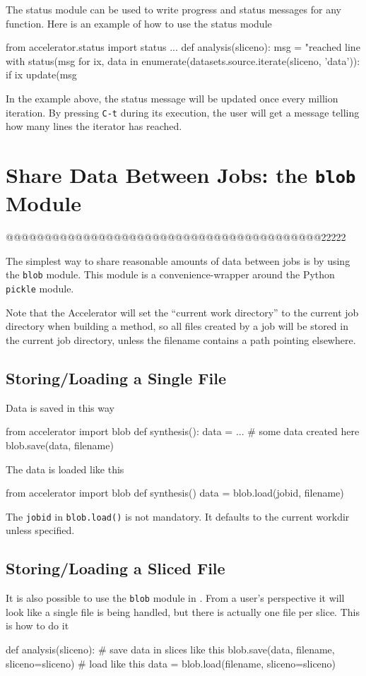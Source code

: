 The status module can be used to write progress and status messages
for any function.  Here is an example of how to use the status module
\begin{python}
from accelerator.status import status
...
def analysis(sliceno):
    msg = "reached line %
    with status(msg %
        for ix, data in enumerate(datasets.source.iterate(sliceno, 'data')):
            if ix %
                update(msg %
\end{python}
In the example above, the status message will be updated once every
million iteration.  By pressing \texttt{C-t} during its execution, the
user will get a message telling how many lines the iterator has
reached.





\section{Share Data Between Jobs:  the \texttt{blob} Module}
@@@@@@@@@@@@@@@@@@@@@@@@@@@@@@@@@@@@@@@@@22222

The simplest way to share reasonable amounts of data between jobs is
by using the \texttt{blob} module.  This module is a
convenience-wrapper around the Python \texttt{pickle} module.

Note that the Accelerator will set the ``current work directory'' to
the current job directory when building a method, so all files created
by a job will be stored in the current job directory, unless the
filename contains a path pointing elsewhere.

\subsection*{Storing/Loading a  Single File}
Data is saved in this way
\begin{python}
from accelerator import blob
def synthesis():
    data = ...  # some data created here
    blob.save(data, filename)
\end{python}
The data is loaded like this
\begin{python}
from accelerator import blob
def synthesis()
    data = blob.load(jobid, filename)
\end{python}
The \texttt{jobid} in \texttt{blob.load()} is not mandatory.  It
defaults to the current workdir unless specified.



\subsection{Storing/Loading a Sliced File}
It is also possible to use the \texttt{blob} module in \analysis.
From a user's perspective it will look like a single file is being
handled, but there is actually one file per slice.  This is how to do
it
\begin{python}
def analysis(sliceno):
    # save data in slices like this
    blob.save(data, filename, sliceno=sliceno)
    # load like this
    data = blob.load(filename, sliceno=sliceno)
\end{python}

